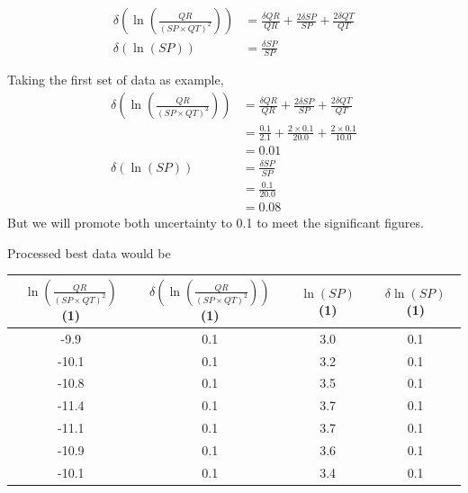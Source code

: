 \documentclass{article}
\begin{document}
\begin{align*}
    \delta\left(\ln\left(\frac{QR}{(SP\times QT)^2}\right)\right)&=\frac{\delta QR}{QR}+\frac{2\delta SP}{SP}+\frac{2\delta QT}{QT}\\
    \delta \left(\ln\left(SP\right)\right)&=\frac{\delta SP}{SP}
\end{align*}

Taking the first set of data as example, 
\begin{align*}
    \delta\left(\ln\left(\frac{QR}{(SP\times QT)^2}\right)\right)&=\frac{\delta QR}{QR}+\frac{2\delta SP}{SP}+\frac{2\delta QT}{QT}\\
    &=\frac{0.1}{2.1}+\frac{2\times 0.1}{20.0}+\frac{2\times 0.1}{10.0}\\
    &=0.01\\
    \delta \left(\ln\left(SP\right)\right)&=\frac{\delta SP}{SP}\\
    &=\frac{0.1}{20.0}\\
    &=0.08
\end{align*}
But we will promote both uncertainty to 0.1 to meet the significant figures.

Processed best data would be
\begin{table}[h]
\centering
\begin{tabular}{|c|c|c|c|}
\hline
$\ln\left(\frac{QR}{(SP\times QT)^2}\right)$ (1) & $\delta\left(\ln\left(\frac{QR}{(SP\times QT)^2}\right)\right)$(1)& $\ln(SP)$(1) & $\delta \ln(SP)$(1) \\ \hline
-9.9                              & 0.1                                     & 3.0    & 0.1          \\ \hline
-10.1                             & 0.1                                     & 3.2    & 0.1          \\ \hline
-10.8                             & 0.1                                     & 3.5    & 0.1          \\ \hline
-11.4                             & 0.1                                     & 3.7    & 0.1          \\ \hline
-11.1                             & 0.1                                     & 3.7    & 0.1          \\ \hline
-10.9                             & 0.1                                     & 3.6    & 0.1          \\ \hline
-10.1                             & 0.1                                     & 3.4    & 0.1          \\ \hline
\end{tabular}
\end{table}
\end{document}
